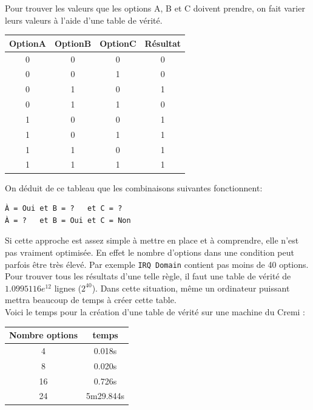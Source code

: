 \documentclass[17pts]{report}
\begin{document}
Pour trouver les valeurs que les options A, B et C doivent prendre, on fait
varier leurs valeurs à l'aide d'une table de vérité.  \\
\newline
\begin{tabular}{|c|c|c||c|}
    \hline
    OptionA & OptionB & OptionC & Résultat\\
    \hline
    \hline
    0 & 0 & 0 & 0\\
    \hline
    0 & 0 & 1 & 0\\
    \hline
    0 & 1 & 0 & 1\\
    \hline
    0 & 1 & 1 & 0\\
    \hline
    1 & 0 & 0 & 1\\
    \hline
    1 & 0 & 1 & 1\\
    \hline
    1 & 1 & 0 & 1\\
    \hline
    1 & 1 & 1 & 1\\
    \hline
\end{tabular}
\newline
\newline

On déduit de ce tableau que les combinaisons suivantes fonctionnent:
\begin{verbatim}
À = Oui et B = ?   et C = ?
À = ?   et B = Oui et C = Non
\end{verbatim}

Si cette approche est assez simple à mettre en place et à comprendre, elle
n'est pas vraiment optimisée. En effet le nombre d'options dans une condition
peut parfois être très élevé. Par exemple \verb|IRQ Domain| contient pas
moins de 40 options.\\
Pour trouver tous les résultats d'une telle règle, il faut une table
de vérité de $1.0995116e^{12}$ lignes ($2^{40}$). Dans cette situation, même
un ordinateur puissant mettra beaucoup de temps à créer cette table.
\\
Voici le temps pour la création d'une table de vérité sur une machine du Cremi :
\\

\begin{tabular}{|c|c|}
    \hline
    Nombre options & temps\\
    \hline
    \hline
    4 & 0.018s\\
    \hline
    8 & 0.020s\\
    \hline
    16 & 0.726s\\
    \hline
    24 & 5m29.844s\\
    \hline
\end{tabular}
\newline
\newline
\end{document}
